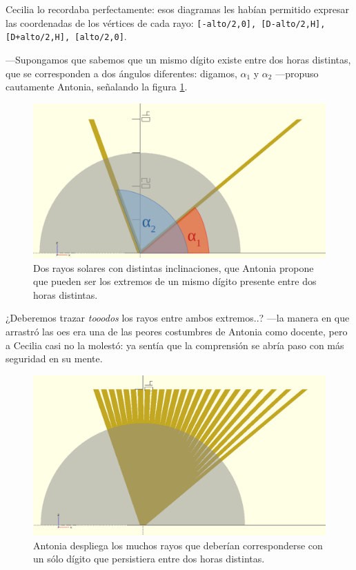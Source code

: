 Cecilia lo recordaba perfectamente: esos diagramas les habían
permitido expresar las coordenadas de los vértices de cada rayo:
\texttt{[-alto/2,0], [D-alto/2,H], [D+alto/2,H], [alto/2,0]}.

---Supongamos que sabemos que un mismo dígito existe entre dos horas
distintas, que se corresponden a dos ángulos diferentes: digamos,
$\alpha_1$ y $\alpha_2$ ---propuso cautamente Antonia, señalando la
figura \ref{fig:dos-rayos-alfas}.


\begin{figure}[ht]
  \centering
  \includegraphics[width=.65\textwidth]{imagenes/dos-rayos-alfas}  
  \caption{Dos rayos solares con distintas inclinaciones, que Antonia
    propone que pueden ser los extremos de un mismo dígito presente
    entre dos horas distintas.}
  \label{fig:dos-rayos-alfas}
\end{figure}


\guillemotright ¿Deberemos trazar \emph{tooodos} los rayos entre
ambos extremos..?  ---la manera en que arrastró las oes era una de las
peores costumbres de Antonia como docente, pero a Cecilia casi no la
molestó: ya sentía que la comprensión se abría paso con más seguridad
en su mente.


\begin{figure}[ht]
  \centering
  \includegraphics[width=.6\textwidth]{imagenes/muchos-rayos}  
  \caption{Antonia despliega los muchos rayos que deberían
    corresponderse con un sólo dígito que persistiera entre dos horas
    distintas.}
  \label{fig:muchos-rayos}
\end{figure}


